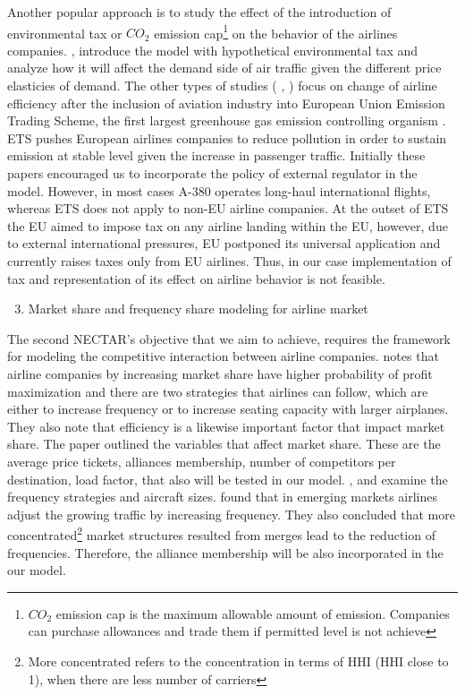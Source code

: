 \documentclass[titlepage, 11pt]{article}
\begin{document}
\tab Another popular approach is to study the effect of the introduction of environmental tax or $CO_2$ emission cap\footnote{$CO_2$ emission cap is the maximum allowable amount of emission. Companies can purchase allowances and trade them if permitted level is not achieve} on the behavior of the airlines companies. \citeauthor{carbon} \cite{carbon}, introduce the model with hypothetical environmental tax and analyze how it will affect the demand side of air traffic given the different price elasticies of demand. The other types of studies (\citeauthor{ETSItaly} \cite{ETSItaly} \citeauthor{demandBusiness} \cite{demandBusiness}, \citeauthor{ETS22} \cite{ETS22}) focus on change of airline efficiency after the inclusion of aviation industry into European Union Emission Trading Scheme, the first largest greenhouse gas emission controlling organism \cite{ETSEU}. ETS pushes European airlines companies to reduce pollution in order to sustain emission at stable level given the increase in passenger traffic. Initially these papers encouraged us to incorporate the policy of external regulator in the model. However, in most cases A-380 operates long-haul international flights, whereas ETS does not apply to non-EU airline companies. At the outset of ETS the EU aimed to impose tax on any airline landing within the EU, however, due to external international pressures, EU postponed its universal application and currently raises taxes only from EU airlines. Thus, in our case implementation of tax and representation of its effect on airline behavior is not feasible. \\ 
\tab 
\begin{enumerate}
\setcounter{enumi}{2}
\item Market share and frequency share modeling for airline market
\end{enumerate}
  \tab The second NECTAR's objective that we aim to achieve, requires the framework for modeling the competitive interaction between airline companies. \citeauthor{marketshare} \cite{marketshare} notes that airline companies by increasing market share have higher probability of profit maximization and there are two strategies that airlines can follow, which are either to increase frequency or to increase seating capacity with larger airplanes. They also note that efficiency is a likewise important factor that impact market share. The paper outlined the variables that affect market share. These are the average price tickets, alliances membership, number of competitors per destination, load factor, that also will be tested in our model. \citeauthor{Pai} \cite{Pai}, \citeauthor{Wang} \cite{Wang} and \citeauthor{Bilot} \cite{Bilot} examine the frequency strategies and aircraft sizes. \citeauthor{Wang} \cite{Wang} found that in emerging markets airlines adjust the growing traffic by increasing frequency. They also concluded that more concentrated\footnote{More concentrated refers to the concentration in terms of HHI (HHI close to 1), when there are less number of carriers} market structures resulted from merges lead to the reduction of frequencies. Therefore, the alliance membership will be also incorporated in the our model. \\
\end{document}
